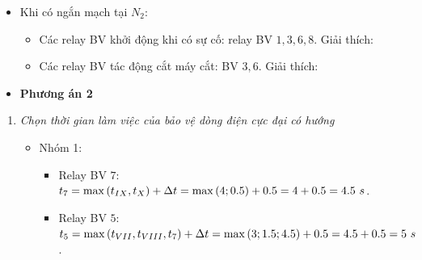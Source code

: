 \documentclass[12pt,a4paper]{article}
\begin{document}
\begin{enumerate}
\begin{enumerate}[\it a.]
\begin{itemize}
							\item Khi có ngắn mạch tại $N_2$:
								\begin{itemize}
									\item Các relay BV khởi động khi có sự cố: relay BV $1,3,6,8$. Giải thích:
										
									\item Các relay BV tác động cắt máy cắt: BV $3, 6$. Giải thích:
								\end{itemize}
						\end{itemize}
				\end{enumerate}
			
			\begin{itemize}
				\item \textbf{Phương án 2}				
			\end{itemize}

			\begin{enumerate}[\it a.]
			\item \emph{Chọn thời gian làm việc của bảo vệ dòng điện cực đại có hướng}
					\begin{itemize}					
						\item Nhóm 1:
							\begin{itemize}
								\item Relay BV $7$: $t_7 = \max\left({t_{IX}, t_{X}}\right) + \Delta t = \max\left({4; 0.5}\right) + 0.5 = 4 + 0.5 = 4.5 ~s$.
								
								\item Relay BV $5$: $t_5 = \max\left({t_{VII}, t_{VIII}, t_7}\right) + \Delta t = \max\left({3; 1.5; 4.5}\right) + 0.5 = 4.5 + 0.5 = 5 ~s$.
								

\end{itemize}
\end{itemize}
\end{enumerate}
\end{enumerate}
\end{document}
